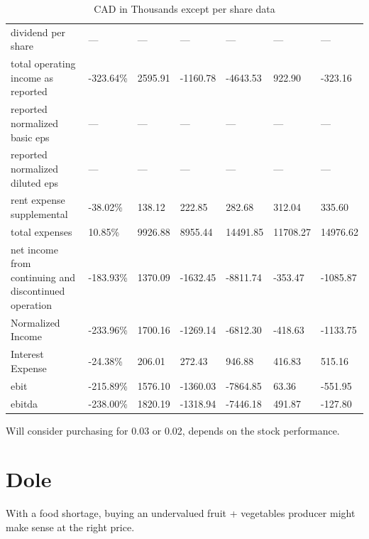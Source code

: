\begin{table}[]
{\begin{tabular}{@{}lllllll@{}}
dividend per share                                            & —          & —         & —         & —        & —        & —        \\
total operating income as reported                            & -323.64\%  & 2595.91   & -1160.78  & -4643.53 & 922.90   & -323.16  \\
reported normalized basic eps                                 & —          & —         & —         & —        & —        & —        \\
reported normalized diluted eps                               & —          & —         & —         & —        & —        & —        \\
rent expense supplemental                                     & -38.02\%   & 138.12    & 222.85    & 282.68   & 312.04   & 335.60   \\
total expenses                                                & 10.85\%    & 9926.88   & 8955.44   & 14491.85 & 11708.27 & 14976.62 \\
net income from continuing and discontinued operation         & -183.93\%  & 1370.09   & -1632.45  & -8811.74 & -353.47  & -1085.87 \\
Normalized Income                                             & -233.96\%  & 1700.16   & -1269.14  & -6812.30 & -418.63  & -1133.75 \\
Interest Expense                                              & -24.38\%   & 206.01    & 272.43    & 946.88   & 416.83   & 515.16   \\
ebit                                                          & -215.89\%  & 1576.10   & -1360.03  & -7864.85 & 63.36    & -551.95  \\
ebitda                                                        & -238.00\%  & 1820.19   & -1318.94  & -7446.18 & 491.87   & -127.80  \\ \bottomrule
\end{tabular}%
}
\caption{CAD in Thousands except per share data}
\end{table}

Will consider purchasing for 0.03 or 0.02, depends on the stock performance.


\section{Dole}

With a food shortage, buying an undervalued fruit + vegetables producer might make sense at the right price.

